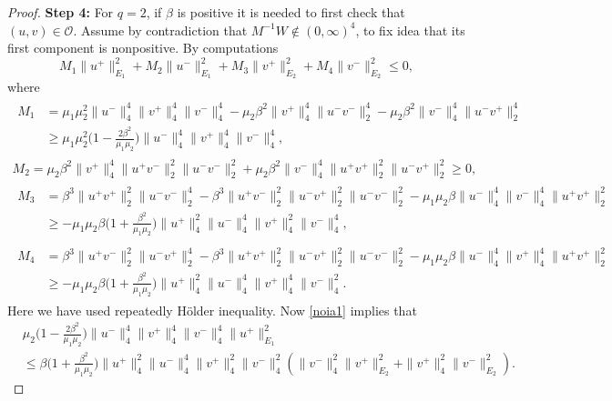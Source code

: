 \documentclass[10pt,a4paper]{amsart}
\numberwithin{equation}{section}
\begin{document}
\begin{proof}
\noindent\textbf{Step 4:} For $q=2$,
if $\beta$ is positive it is needed to first check that $(u,v)\in \mathcal O$.
Assume by contradiction that $M^{-1}W \notin (0,\infty)^4$, to fix idea that its
first component is nonpositive. By computations
\begin{equation}\label{noia1}
 M_1 \|u^+\|_{E_1}^2 + M_2 \|u^-\|_{E_1}^2 + M_3 \|v^+\|_{E_2}^2
 + M_4  \|v^-\|_{E_2}^2 \le 0,
\end{equation}
where
\begin{gather*}
\begin{aligned}
M_1&=  \mu_1\mu_2^2 \|u^-\|_4^4\|v^+\|_4^4\|v^-\|_4^4
- \mu_2\beta^2\|v^+\|_4^4\|u^-v^-\|_2^4
- \mu_2\beta^2\|v^-\|_4^4\|u^-v^+\|_2^4  \\
&\ge  \mu_1\mu_2^2 \Big(1-\frac{2\beta^2}{\mu_1\mu_2} \Big)
 \|u^-\|_4^4\|v^+\|_4^4\|v^-\|_4^4 ,
\end{aligned} \\
M_2=  \mu_2\beta^2 \|v^+\|_4^4\|u^+v^-\|_2^2 \|u^-v^-\|_2^2
 + \mu_2\beta^2 \|v^-\|_4^4\|u^+v^+\|_2^2 \|u^-v^+\|_2^2 \ge 0 , \\
\begin{aligned}
M_3 &=  \beta^3 \|u^+v^+\|_2^2 \|u^-v^-\|_2^4 - \beta^3 \|u^+v^-\|_2^2
 \|u^-v^+\|_2^2\|u^-v^-\|_2^2 - \mu_1\mu_2\beta\|u^-\|_4^4\|v^-\|_4^4\|u^+v^+\|_2^2
\\
&\ge  - \mu_1\mu_2 {\beta}\Big(1+\frac{\beta^2}{\mu_1\mu_2}\Big)
 \|u^+\|_4^2\|u^-\|_4^4\|v^+\|_4^2\|v^-\|_4^4,
\end{aligned}\\
\begin{aligned}
 M_4 &=  \beta^3 \|u^+v^-\|_2^2 \|u^-v^+\|_2^4 - \beta^3
  \|u^+v^+\|_2^2 \|u^-v^+\|_2^2\|u^-v^-\|_2^2 - \mu_1\mu_2\beta\|u^-\|_4^4\|v^+
  \|_4^4\|u^+v^+\|_2^2
 \\
&\ge  - \mu_1\mu_2 {\beta}\Big(1+\frac{\beta^2}{\mu_1\mu_2}\Big)
 \|u^+\|_4^2\|u^-\|_4^4\|v^+\|_4^4\|v^-\|_4^2.
\end{aligned}
\end{gather*}
Here we have used repeatedly H\"older inequality. Now \eqref{noia1} implies that
\begin{equation}\label{noia2}
\begin{split}
&\mu_2 \Big(1-\frac{2\beta^2}{\mu_1\mu_2} \Big)
 \|u^-\|_4^4\|v^+\|_4^4\|v^-\|_4^4 \|u^+\|_{E_1}^2 \\
&\le   {\beta}\Big(1+\frac{\beta^2}{\mu_1\mu_2}\Big)
 \|u^+\|_4^2\|u^-\|_4^4\|v^+\|_4^2\|v^-\|_4^2
\left( \|v^-\|_4^2\|v^+\|_{E_2}^2 + \|v^+\|_4^2\|v^-\|_{E_2}^2 \right) .
\end{split}

\end{equation}
\end{proof}
\end{document}
